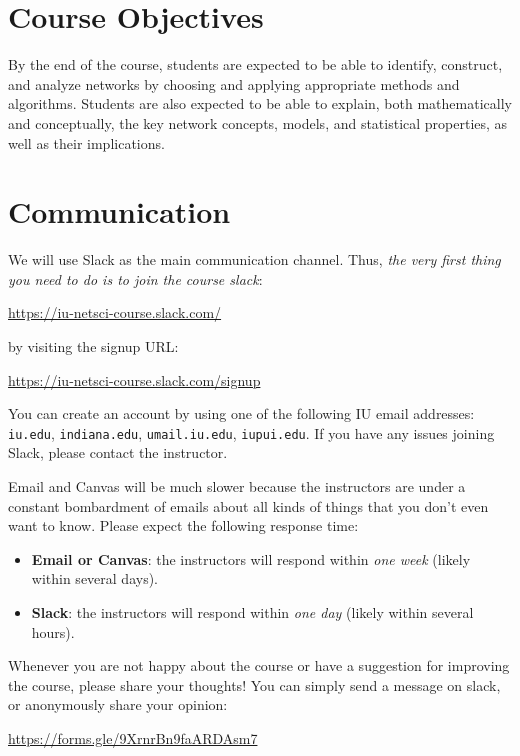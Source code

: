 \documentclass[11pt,article,oneside]{memoir} %
\begin{document}
\section{Course Objectives} %

By the end of the course, students are expected to be able to identify, construct, and analyze networks by choosing and applying appropriate methods and algorithms.
Students are also expected to be able to explain, both mathematically and conceptually, the key network concepts, models, and statistical properties, as well as their implications.
\section{Communication} %

We will use Slack as the main communication channel.
Thus, \emph{the very first thing you need to do is to join the course slack}:

\url{https://iu-netsci-course.slack.com/}

by visiting the signup URL:

\url{https://iu-netsci-course.slack.com/signup}

You can create an account by using one of the following IU email addresses: \texttt{iu.edu}, \texttt{indiana.edu}, \texttt{umail.iu.edu}, \texttt{iupui.edu}.
If you have any issues joining Slack, please contact the instructor.

Email and Canvas will be much slower because the instructors are under a constant bombardment of emails about all kinds of things that you don't even want to know. Please expect the following response time:

\begin{itemize}
\item \textbf{Email or Canvas}: the instructors will respond within \emph{one week} (likely within several days).
\item \textbf{Slack}: the instructors will respond within \emph{one day} (likely within several hours).

\end{itemize}

Whenever you are not happy about the course or have a suggestion for improving the course, please share your thoughts! You can simply send a message on slack, or anonymously share your opinion:

\url{https://forms.gle/9XrnrBn9faARDAsm7}

\end{document}
